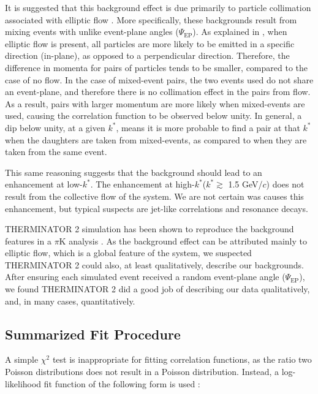 \documentclass[ALICE,manyauthors]{cernphprep}
\newcommand{\kstar}{$k^{*}$\xspace}
\begin{document}
It is suggested that this background effect is due primarily to particle collimation associated with elliptic flow \cite{Kisiel:2017}.  
More specifically, these backgrounds result from mixing events with unlike event-plane angles ($\Psi_{\textrm{EP}}$).  
As explained in \cite{Kisiel:2017}, when elliptic flow is present, all particles are more likely to be emitted in a specific direction (in-plane), as opposed to a perpendicular direction.  
Therefore, the difference in momenta for pairs of particles tends to be smaller, compared to the case of no flow.  
In the case of mixed-event pairs, the two events used do not share an event-plane, and therefore there is no collimation effect in the pairs from flow.  
As a result, pairs with larger momentum are more likely when mixed-events are used, causing the correlation function to be observed below unity.  
In general, a dip below unity, at a given \kstar, means it is more probable to find a pair at that \kstar when the daughters are taken from mixed-events, as compared to when they are taken from the same event.

This same reasoning suggests that the background should lead to an enhancement at low-\kstar.  
The enhancement at high-\kstar (\kstar $\gtrsim$ 1.5 GeV/$c$) does not result from the collective flow of the system.  
We are not certain was causes this enhancement, but typical suspects are jet-like correlations and resonance decays.



THERMINATOR 2 simulation has been shown to reproduce the background features in a $\pi$K analysis \cite{Kisiel:2017}.  
As the background effect can be attributed mainly to elliptic flow, which is a global feature of the system, we suspected THERMINATOR 2 could also, at least qualitatively, describe our backgrounds.  
After ensuring each simulated event received a random event-plane angle ($\Psi_{\mathrm{EP}}$), we found THERMINATOR 2 did a good job of describing our data qualitatively, and, in many cases, quantitatively.  

\subsection{Summarized Fit Procedure}
\label{SummarizedFitProcedure}


A simple $\chi^{2}$ test is inappropriate for fitting correlation functions, as the ratio two Poisson distributions does not result in a Poisson distribution.
Instead, a log-likelihood fit function of the following form is used \cite{Lisa:2005dd}:
\end{document}

